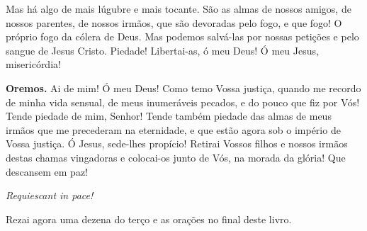 Mas há algo de mais lúgubre e mais tocante. São as almas de nossos amigos, de nossos parentes, de nossos irmãos, que são devoradas pelo fogo, e que fogo! O próprio fogo da cólera de Deus. Mas podemos salvá-las por nossas petições e pelo sangue de Jesus Cristo. Piedade! Libertai-as, ó meu Deus! Ó meu Jesus, misericórdia!


\vspace{\baselineskip}\noindent \textbf{Oremos.} Ai de mim! Ó meu Deus! Como temo Vossa justiça, quando me recordo de minha vida sensual, de meus inumeráveis pecados, e do pouco que fiz por Vós! Tende piedade de mim, Senhor! Tende também piedade das almas de meus irmãos que me precederam na eternidade, e que estão agora sob o império de Vossa justiça. Ó Jesus, sede-lhes propício! Retirai Vossos filhos e nossos irmãos destas chamas vingadoras e colocai-os junto de Vós, na morada da glória! Que descansem em paz!



\begin{center}
\textit{Requiescant in pace!}
\end{center}

Rezai agora uma dezena do terço e as orações no final deste livro.
